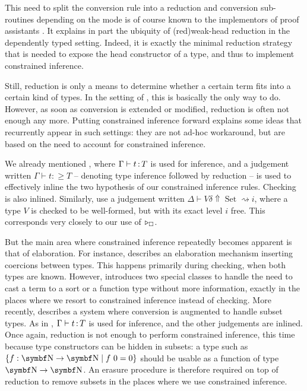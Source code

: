 This need to split the conversion rule into a reduction and conversion sub-routines depending on the mode is of course known to the implementors of proof assistants .
It explains in part the ubiquity of \kl(red){weak-head} reduction
in the dependently typed setting.
Indeed, it is exactly the minimal reduction strategy that is needed to expose the
head constructor of a type, and thus to implement constrained inference.

Still, reduction is only a means to determine whether a certain term fits into
a certain kind of types. In the setting of , this is basically the only way to do.
However, as soon as conversion is extended or modified,
reduction is often not enough any more.
Putting constrained inference forward explains some ideas that recurrently appear in
such settings:  they are not ad-hoc workaround,
but are based on the need to account for constrained inference.

We already mentioned , where $\Gamma \vdash t \operatorname{:} T$ is used
for inference, and a judgement written $\Gamma \vdash t \mathrel{:\geq} T$ –
denoting type inference followed by reduction –
is used to effectively inline the two hypothesis of our constrained inference rules.
Checking is also inlined.
Similarly,  use a judgement written $\Delta \vdash V \delta \Uparrow \operatorname{Set} \rightsquigarrow i$, where a type $V$ is checked to be well-formed, but with its exact level $i$ free. This corresponds very closely to our use of $\pity{\uni}$.

But the main area where constrained inference repeatedly becomes apparent is that of
elaboration. For instance,
 describes an elaboration mechanism inserting coercions between types.
This happens primarily during checking, when both types are known.
However, \citeauthor{Saibi1997} introduces two special classes to handle the need
to cast a term to a sort or a function type without more information,
exactly in the places where we resort to constrained inference instead of checking.
More recently,  describes a system where conversion is augmented
to handle subset types.
As in \textcite{Pollack1992}, $\Gamma \vdash t \operatorname{:} T$ is used for inference,
and the other judgements are inlined.
Once again, reduction is not enough to perform constrained inference, this time
because type constructors can be hidden in subsets:
a type such as $\{f : \Nat \to \Nat \mid f\ 0 = 0 \}$
should be usable as a function of type $\Nat \to \Nat$.
An erasure procedure is therefore required on top of reduction to remove subsets in the places where we use constrained inference.

